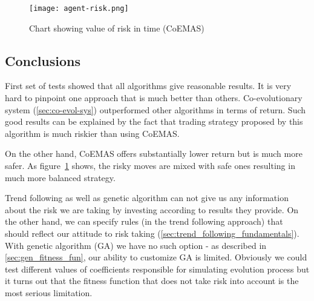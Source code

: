 \begin{figure}[ht]
  \begin{center}
    \texttt{[image: agent-risk.png]}
  \end{center}
  \caption{Chart showing value of risk in time (CoEMAS)}
  \label{fig:agent_risk}
\end{figure}

\subsection{Conclusions}

First set of tests showed that all algorithms give reasonable results.
It is very hard to pinpoint one approach that is much better than others.
Co-evolutionary system (\ref{sec:co-evol-sys}) outperformed other algorithms in terms of return.
Such good results can be explained by the fact that trading strategy proposed by this algorithm is much riskier than using CoEMAS.
  
On the other hand, CoEMAS offers substantially lower return but is much more safer.
As figure~\ref{fig:agent_risk} shows, the risky moves are mixed with safe ones resulting in much more balanced strategy.

Trend following as well as genetic algorithm can not give us any information about the risk we are taking by investing according to results they provide.
On the other hand, we can specify rules (in the trend following approach) that should reflect our attitude to risk taking (\ref{sec:trend_following_fundamentals}).
With genetic algorithm (GA) we have no such option - as described in \ref{sec:gen_fitness_fun}, our ability to customize GA is limited.
Obviously we could test different values of coefficients responsible for simulating evolution process but it turns out that the fitness function that does not take risk into
account is the most serious limitation.

